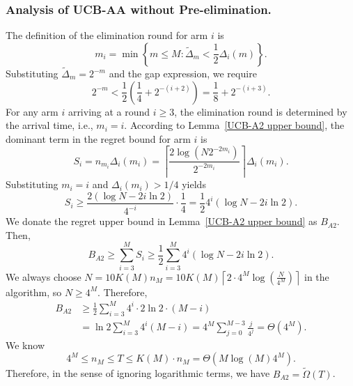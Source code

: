 \documentclass[
  12pt]{article}
\begin{document}
\subsubsection*{Analysis of UCB-AA without Pre-elimination.}
The definition of the elimination round for arm $i$ is
\[
m_i = \min \left\{ m \leq M :\tilde{\Delta}_m < \frac{1}{2}\Delta_i(m) \right\}.
\]
Substituting $\tilde{\Delta}_m = 2^{-m}$ and the gap expression, we require
\[
2^{-m} < \frac{1}{2}\left(\frac{1}{4} + 2^{-(i+2)}\right) = \frac{1}{8} + 2^{-(i+3)}.
\]
For any arm $i$ arriving at a round $i \ge 3$, the elimination round is determined by the arrival time, i.e., $m_i=i$.
According to Lemma~\ref{UCB-A2 upper bound}, the dominant term in the regret bound for arm $i$ is
\[
S_i = n_{m_i} \Delta_i(m_i) = \left\lceil \frac{2 \log(N 2^{-2m_i})}{2^{-2m_i}} \right\rceil \Delta_i(m_i).
\]
Substituting $m_i = i$ and $\Delta_i(m_i) > 1/4$ yields
\[
S_i \ge \frac{2 (\log N - 2i \ln 2)}{4^{-i}} \cdot \frac{1}{4} = \frac{1}{2} 4^i (\log N - 2i \ln 2).
\]
We donate the regret upper bound in Lemma~\ref{UCB-A2 upper bound} as $B_{A2}$. Then,
\[
B_{A2} \geq  \sum_{i=3}^{M} S_i \geq \frac{1}{2} \sum_{i=3}^{M} 4^i (\log N - 2i \ln 2).
\]
We always choose $N=10K(M)n_{M}=10 K(M) \left\lceil 2\cdot 4^M\log\left(\frac{N}{4^M}\right) \right\rceil$ in the algorithm, so $N \geq 4^M$. Therefore,
\[
\begin{aligned}
B_{A2} &\geq \frac{1}{2} \sum_{i=3}^{M} 4^i \cdot 2 \ln 2 \cdot (M - i) \\
&= \ln 2 \sum_{i=3}^{M} 4^i (M - i)
 = 4^M \sum_{j=0}^{M-3} \frac{j}{4^j}=\Theta(4^M).
\end{aligned}
\]
We know
\[4^M \leq n_M\leq T\leq K(M)\cdot n_M = \Theta(M\log(M)4^M).\]
Therefore, in the sense of ignoring logarithmic terms, we have $B_{A2} =\tilde{\Omega}(T)$.
\end{document}
